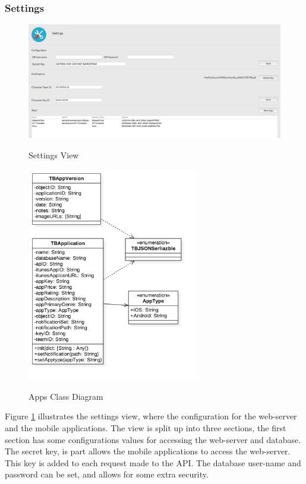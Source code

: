 

\subsubsection{Settings}

\begin{figure}[!h]
    \caption{Settings View}
    \centering
    \includegraphics[width=150mm]{images/dashboard/settings}
    \label{fig:settings-view}
\end{figure} 


\begin{figure}[!h]
    \caption{Apps Class Diagram}
    \centering
    \includegraphics[width=75mm]{images/classdiagrams/Settings}
    \label{fig:settings-cd}
\end{figure} 

Figure \ref{fig:settings-view} illustrates the settings view, where the configuration for the web-server and the mobile applications. The view is split up into three sections, the first section has some configurations values for accessing the web-server and database. The secret key, is part allows the mobile applications to access the web-server. This key is added to each request made to the API. The database user-name and password can be set, and allows for some extra security.

